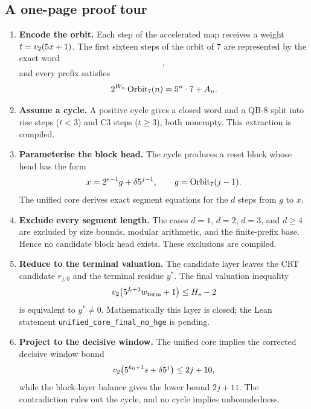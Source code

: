 \subsection{A one-page proof tour}

\begin{enumerate}[leftmargin=*]
\item \textbf{Encode the orbit.}  Each step of the accelerated map
  receives a weight $t=v_2\!\left(5x+1\right)$.  The first sixteen steps of the
  orbit of $7$ are represented by the exact word
  \begin{equation*}
    [2,1,2,1,1,2,1,1,1,2,2,2,2,1,1,3],
  \end{equation*}
  and every prefix satisfies
  \begin{equation*}
    2^{W_n}\,\mathrm{Orbit}_7(n)=5^n\cdot7+A_n.
  \end{equation*}
\item \textbf{Assume a cycle.}  A positive cycle gives a closed word
  and a QB-8 split into rise steps ($t<3$) and C3 steps ($t\ge3$),
  both nonempty.  This extraction is compiled.
\item \textbf{Parameterise the block head.}  The cycle produces a
  reset block whose head has the form
  \begin{equation*}
    x=2^{e-1}g+\delta5^{j-1},
    \qquad g=\mathrm{Orbit}_7(j-1).
  \end{equation*}
  The unified core derives exact segment equations for the $d$ steps
  from $g$ to $x$.
\item \textbf{Exclude every segment length.}  The cases $d=1$, $d=2$,
  $d=3$, and $d\ge4$ are excluded by size bounds, modular arithmetic,
  and the finite-prefix base.  Hence no candidate block head exists.
  These exclusions are compiled.
\item \textbf{Reduce to the terminal valuation.}  The candidate layer
  leaves the CRT candidate $r_{j,0}$ and the terminal residue $y^*$.
  The final valuation inequality
  \begin{equation*}
    v_2\!\left(5^{L+3}w_{\mathrm{term}}+1\right)\le H_s-2
  \end{equation*}
  is equivalent to $y^*\ne0$.  Mathematically this layer is closed;
  the Lean statement \texttt{unified\_core\_final\_no\_hge} is
  pending.
\item \textbf{Project to the decisive window.}  The unified core
  implies the corrected decisive window bound
  \begin{equation*}
    v_2\!\left(5^{k_0+1}s+\delta5^j\right)\le2j+10,
  \end{equation*}
  while the block-layer balance gives the lower bound $2j+11$.  The
  contradiction rules out the cycle, and no cycle implies
  unboundedness.
\end{enumerate}

